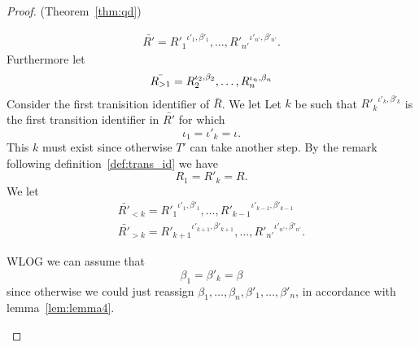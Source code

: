 \begin{proof}{(Theorem~\ref{thm:qd})}
\begin{description}
\begin{equation*}
\begin{gathered}
          \bar{R'} = {R'_1}^{\iota'_1, \beta'_1}, \dots, {R'_{n'}}^{\iota'_{n'},
          \beta'_{n'}}.
        \end{gathered}
      \end{equation*}
      Furthermore let
      \begin{equation*}
        \bar{R_{>1}} = R_2^{\iota_2, \beta_2}, \dots, R_n^{\iota_n, \beta_n} \\
      \end{equation*}
      Consider the first tranisition identifier of $\bar{R}$. We let
      Let $k$ be such
      that ${R'_k}^{\iota'_k, \beta'_k}$ is the first transition identifier in
      $\bar{R'}$ for which 
      \begin{equation*}
        \iota_1 = \iota'_k = \iota.
      \end{equation*} 
      This $k$ must exist since
      otherwise $T'$ can take another step. By the remark following
      definition~\ref{def:trans_id} we have 
      \begin{equation*}
        R_1 = R'_k = R.
      \end{equation*} 
      We let
      \begin{equation*}
        \begin{gathered}
          \bar{R'}_{<k} = {R'_1}^{\iota'_1, \beta'_1}, \dots,
          {R'_{k-1}}^{\iota'_{k-1}, \beta'_{k-1}}  \\
          \bar{R'}_{>k} = {R'_{k+1}}^{\iota'_{k+1}, \beta'_{k+1}}, \dots,
          {R'_{n'}}^{\iota'_{n'}, \beta'_{n'}}.
        \end{gathered}
      \end{equation*}

      WLOG we can assume that
      \begin{equation*}
        \beta_1 = \beta'_k = \beta
      \end{equation*}
      since otherwise we could just reassign $\beta_1, \dots, \beta_n, \beta'_1, \dots,
      \beta'_n$, in accordance with lemma~\ref{lem:lemma4}.

%


\end{description}
\end{proof}
